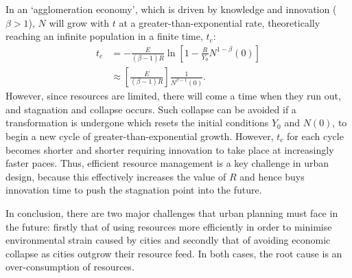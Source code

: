 In an `agglomeration economy', which is driven by knowledge and innovation ($\beta>1$), $N$ will grow with $t$ at a greater-than-exponential rate, theoretically reaching an infinite population in a finite time, $t_c$:
\begin{align}
	t_c&=-\frac{E}{(\beta-1)R}\ln\left[1-\frac{R}{Y_0}N^{1-\beta}(0)\right] \\
	&\approx \left[\frac{E}{(\beta-1)R}\right]\frac{1}{N^{\beta-1}(0)}.
\end{align}
However, since resources are limited, there will come a time when they run out, and stagnation and collapse occurs. Such collapse can be avoided if a transformation is undergone which resets the initial conditions $Y_0$ and $N(0)$, to begin a new cycle of greater-than-exponential growth. However, $t_c$ for each cycle becomes shorter and shorter requiring innovation to take place at increasingly faster paces. Thus, efficient resource management is a key challenge in urban design, because this effectively increases the value of $R$ and hence buys innovation time to push the stagnation point into the future.

In conclusion, there are two major challenges that urban planning must face in the future: firstly that of using resources more efficiently in order to minimise environmental strain caused by cities and secondly that of avoiding economic collapse as cities outgrow their resource feed. In both cases, the root cause is an over-consumption of resources. 

